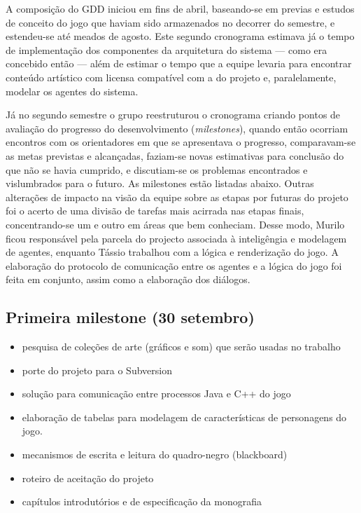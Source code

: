 A composição do GDD iniciou em fins de abril, baseando-se em previas e estudos de conceito do jogo que haviam sido armazenados no decorrer do semestre, e estendeu-se até meados de agosto. Este segundo cronograma estimava já o tempo de implementação dos componentes da arquitetura do sistema --- como era concebido então --- além de estimar o tempo que a equipe levaria para encontrar conteúdo artístico com licensa compatível com a do projeto e, paralelamente, modelar os agentes do sistema.

Já no segundo semestre o grupo reestruturou o cronograma criando pontos de avaliação do progresso do desenvolvimento (\emph{milestones}), quando então ocorriam encontros com os orientadores em que se apresentava o progresso, comparavam-se as metas previstas e alcançadas, faziam-se novas estimativas para conclusão do que não se havia cumprido, e discutiam-se os problemas encontrados e vislumbrados para o futuro. As milestones estão listadas abaixo. Outras alterações de impacto na visão da equipe sobre as etapas por futuras do projeto foi o acerto de uma divisão de tarefas mais acirrada nas etapas finais, concentrando-se um e outro em áreas que bem conheciam. Desse modo, Murilo ficou responsável pela parcela do projecto associada à inteligêngia e modelagem de agentes, enquanto Tássio trabalhou com a lógica e renderização do jogo. A elaboração do protocolo de comunicação entre os agentes e a lógica do jogo foi feita em conjunto, assim como a elaboração dos diálogos.

\subsection{Primeira milestone (30 setembro)}
\begin{itemize}
\item pesquisa de coleções de arte (gráficos e som) que serão usadas no trabalho
\item porte do projeto para o Subversion
\item solução para comunicação entre processos Java e C++ do jogo
\item elaboração de tabelas para modelagem de características de personagens do jogo.
\item mecanismos de escrita e leitura do quadro-negro (blackboard)
\item roteiro de aceitação do projeto
\item capítulos introdutórios e de especificação da monografia
\end{itemize}

